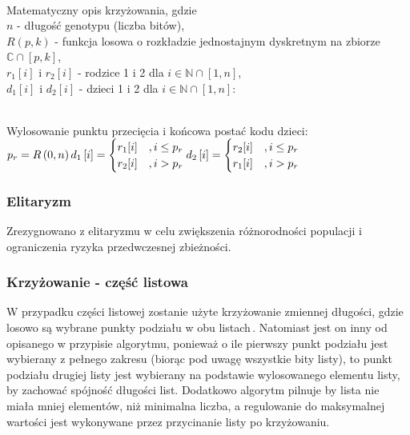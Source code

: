 \noindent\\
Matematyczny opis krzyżowania, gdzie\\
$n$ - długość genotypu (liczba bitów),\\
$R\left(p, k\right)$ - funkcja losowa o rozkładzie jednostajnym dyskretnym
  na zbiorze $\mathbb{C} \cap \left[p, k\right]$,\\
$r_1\left[i\right]$ i $r_2\left[i\right]$ -
  rodzice 1 i 2 dla
  $i \in \mathbb{N} \cap \left[1, n\right]$,\\
$d_1\left[i\right]$ i $d_2\left[i\right]$ -
  dzieci 1 i 2 dla
  $i \in \mathbb{N} \cap \left[1, n\right]$:

\noindent\\
Wylosowanie punktu przecięcia i końcowa postać kodu dzieci:\\
$\displaystyle
  p_r=R\left(0, n\right)\\
  d_1\left[i\right]=\begin{cases}
    r_1[i]
      &, i \le p_r\\
    r_2[i]
      &, i>p_r\\
  \end{cases}\\
  d_2\left[i\right]=\begin{cases}
    r_2[i]
      &, i \le p_r\\
    r_1[i]
      &, i>p_r\\
  \end{cases}
$

\subsubsection*{Elitaryzm}
Zrezygnowano z elitaryzmu w celu zwiększenia
różnorodności populacji i ograniczenia
ryzyka przedwczesnej zbieżności.

\subsubsection{Krzyżowanie - część listowa}
W przypadku części listowej zostanie użyte krzyżowanie zmiennej długości,
gdzie losowo są wybrane punkty podziału w obu listach\,.
Natomiast jest on inny od opisanego w przypisie algorytmu,
ponieważ o ile pierwszy punkt podziału jest wybierany z pełnego zakresu
(biorąc pod uwagę wszystkie bity listy),
to punkt podziału drugiej listy jest wybierany na podstawie
wylosowanego elementu listy, by zachować spójność długości list.
Dodatkowo algorytm pilnuje by lista nie miała mniej elementów,
niż minimalna liczba, a regulowanie do maksymalnej wartości
jest wykonywane przez przycinanie listy po krzyżowaniu.

